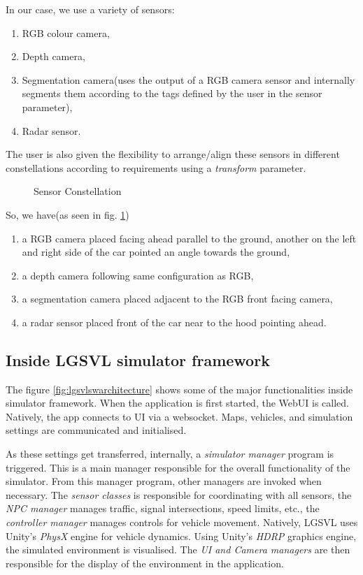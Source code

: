 In our case, we use a variety of sensors:
\begin{enumerate}
    \item RGB colour camera,
    \item Depth camera,
    \item Segmentation camera(uses the output of a RGB camera sensor and internally segments them
according to the tags defined by the user in the sensor parameter),
    \item Radar sensor.
\end{enumerate}


The user is also given the flexibility to arrange/align these sensors in different constellations according to
requirements using a \textit{transform} parameter.
\begin{figure}[!ht]
	\centering
    \def\svgwidth{\textwidth}
    \caption{Sensor Constellation}
    \label{fig:simplesensorconstellation}
\end{figure}

So, we have(as seen in fig. \ref{fig:simplesensorconstellation})

\begin{enumerate}

    \item a RGB camera placed facing ahead parallel to the ground, another on
the left and right side of the car pointed an angle towards the ground,
    \item a depth camera following same configuration as RGB,
    \item a segmentation camera placed adjacent to the RGB front facing camera,
    \item a radar sensor placed front of the car near to the hood pointing ahead.
\end{enumerate}

\subsection{Inside LGSVL simulator framework}
The figure \ref{fig:lgsvlswarchitecture} shows some of the major functionalities inside
simulator framework. When the application is first started, the WebUI is called. Natively,
the app connects to UI via a websocket. Maps, vehicles, and simulation settings are
communicated and initialised.

As these settings get transferred, internally, a \textit{simulator manager} program is
triggered. This is a main manager responsible for the overall functionality of the
simulator. From this manager program, other managers are invoked when necessary. The
\textit{sensor classes} is responsible for coordinating with all sensors, the \textit{NPC
manager} manages traffic, signal intersections, speed limits, etc., the \textit{controller
manager} manages controls for vehicle movement. Natively, LGSVL uses Unity's \textit{PhysX} engine
for vehicle dynamics. Using Unity's \textit{HDRP} graphics engine, the simulated environment is visualised. The
\textit{UI and Camera managers} are then responsible for the display of the environment in
the application.

